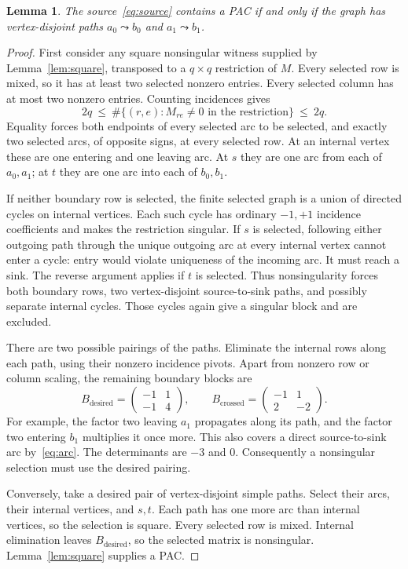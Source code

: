 \documentclass[11pt,a4paper]{article}
\newtheorem{lemma}[theorem]{Lemma}
\begin{document}
\begin{lemma}\label{lem:link}
The source~\eqref{eq:source} contains a PAC if and only if the graph has
vertex-disjoint paths $a_0\leadsto b_0$ and $a_1\leadsto b_1$.
\end{lemma}
\begin{proof}
First consider any square nonsingular witness supplied by
Lemma~\ref{lem:square}, transposed to a $q\times q$ restriction of $M$.
Every selected row is mixed, so it has at least two selected nonzero
entries. Every selected column has at most two nonzero entries. Counting
incidences gives
\begin{equation}\label{eq:saturation}
 2q\ \leq\ \#\{(r,e):M_{re}\ne0\text{ in the restriction}\}\ \leq\ 2q.
\end{equation}
Equality forces both endpoints of every selected arc to be selected, and
exactly two selected arcs, of opposite signs, at every selected row.
At an internal vertex these are one entering and one leaving arc. At $s$
they are one arc from each of $a_0,a_1$; at $t$ they are one arc into each
of $b_0,b_1$.

If neither boundary row is selected, the finite selected graph is a union
of directed cycles on internal vertices. Each such cycle has ordinary
$-1,+1$ incidence coefficients and makes the restriction singular. If $s$
is selected, following either outgoing path through the unique outgoing
arc at every internal vertex cannot enter a cycle: entry would violate
uniqueness of the incoming arc. It must reach a sink. The reverse argument
applies if $t$ is selected. Thus nonsingularity forces both boundary rows,
two vertex-disjoint source-to-sink paths, and possibly separate internal
cycles. Those cycles again give a singular block and are excluded.

There are two possible pairings of the paths. Eliminate the internal rows
along each path, using their nonzero incidence pivots. Apart from nonzero
row or column scaling, the remaining boundary blocks are
\begin{equation}\label{eq:blocks}
 B_{\mathrm{desired}}=
 \begin{pmatrix}-1&1\\-1&4\end{pmatrix},
 \qquad
 B_{\mathrm{crossed}}=
 \begin{pmatrix}-1&1\\2&-2\end{pmatrix}.
\end{equation}
For example, the factor two leaving $a_1$ propagates along its path, and
the factor two entering $b_1$ multiplies it once more. This also covers a
direct source-to-sink arc by~\eqref{eq:arc}. The determinants are $-3$ and
$0$. Consequently a nonsingular selection must use the desired pairing.

Conversely, take a desired pair of vertex-disjoint simple paths. Select
their arcs, their internal vertices, and $s,t$. Each path has one more arc
than internal vertices, so the selection is square. Every selected row is
mixed. Internal elimination leaves $B_{\mathrm{desired}}$, so the selected
matrix is nonsingular. Lemma~\ref{lem:square} supplies a PAC.
\end{proof}
\end{document}
